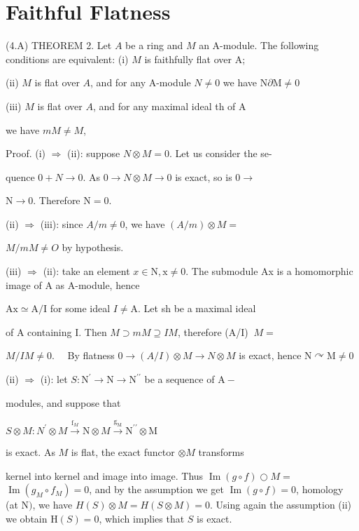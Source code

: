 \section{Faithful Flatness}
(4.A) THEOREM 2. Let $A$ be a ring and $M$ an A-module. The following conditions are equivalent: (i) $M$ is faithfully flat over A;

(ii) $M$ is flat over $A$, and for any A-module $N \neq 0$ we have $\mathrm{N} \partial \mathrm{M} \neq 0$

(iii) $M$ is flat over $A$, and for any maximal ideal th of A

we have $m M \neq M$,

Proof. (i) $\Rightarrow$ (ii): suppose $N \otimes M=0$. Let us consider the se-

quence $0+N \rightarrow 0$. As $0 \rightarrow N \otimes M \rightarrow 0$ is exact, so is $0 \rightarrow$

$\mathrm{N} \rightarrow 0$. Therefore $\mathrm{N}=0$.

(ii) $\Rightarrow$ (iii): since $A / m \neq 0$, we have $(A / m) \otimes M=$

$M / m M \neq O$ by hypothesis.

(iii) $\Rightarrow$ (ii): take an element $x \in \mathrm{N}, \mathrm{x} \neq 0$. The submodule Ax is a homomorphic image of A as A-module, hence

$\mathrm{Ax} \simeq \mathrm{A} / \mathrm{I}$ for some ideal $I \neq \mathrm{A}$. Let sh be a maximal ideal

of A containing I. Then $M \supset m M \supseteq I M$, therefore (A/I) $\ M=$

$M / I M \neq 0 . \quad$ By flatness $0 \rightarrow(A / I) \otimes M \rightarrow N \otimes M$ is exact, hence $\mathrm{N} \curvearrowright \mathrm{M} \neq 0$

(ii) $\Rightarrow$ (i): let $S: \mathrm{N}^{\prime} \rightarrow \mathrm{N} \rightarrow \mathrm{N}^{\prime \prime}$ be a sequence of $\mathrm{A}-$

modules, and suppose that

$S \otimes M: N^{\prime} \otimes M \stackrel{\mathrm{f}_{M}}{\rightarrow} \mathrm{N} \otimes M \stackrel{\mathrm{g}_{\mathrm{M}}}{\rightarrow} \mathrm{N}^{\prime \prime} \otimes \mathrm{M}$

is exact. As $M$ is flat, the exact functor $\otimes M$ transforms

kernel into kernel and image into image. Thus $\operatorname{Im}(g \circ f) \bigcirc M=$ $\operatorname{Im}\left(g_{M} \circ f_{M}\right)=0$, and by the assumption we get $\operatorname{Im}(g \circ f)=0$, homology (at $\mathrm{N})$, we have $H(S) \otimes M=H(S \otimes M)=0$. Using again the assumption (ii) we obtain $\mathrm{H}(S)=0$, which implies that $S$ is exact.

